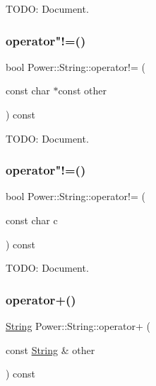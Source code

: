 T\+O\+DO\+: Document. 

\mbox{\label{class_power_1_1_string_a267b8f261bcafb9ec6d86cfe12494c94}} 
\subsubsection{\texorpdfstring{operator"!=()}{operator!=()}\hspace{0.1cm}{\footnotesize\ttfamily [2/3]}}
{\footnotesize\ttfamily bool Power\+::\+String\+::operator!= (\begin{DoxyParamCaption}\item[{const char $\ast$const}]{other }\end{DoxyParamCaption}) const\hspace{0.3cm}{\ttfamily [inline]}}



T\+O\+DO\+: Document. 

\mbox{\label{class_power_1_1_string_a3216ffa5d292b08997d1c93d3c33251e}} 
\subsubsection{\texorpdfstring{operator"!=()}{operator!=()}\hspace{0.1cm}{\footnotesize\ttfamily [3/3]}}
{\footnotesize\ttfamily bool Power\+::\+String\+::operator!= (\begin{DoxyParamCaption}\item[{const char}]{c }\end{DoxyParamCaption}) const\hspace{0.3cm}{\ttfamily [inline]}}



T\+O\+DO\+: Document. 

\mbox{\label{class_power_1_1_string_a570430069e83e0421ccdfb3cddc8a899}} 
\subsubsection{\texorpdfstring{operator+()}{operator+()}\hspace{0.1cm}{\footnotesize\ttfamily [1/11]}}
{\footnotesize\ttfamily \hyperlink{class_power_1_1_string}{String} Power\+::\+String\+::operator+ (\begin{DoxyParamCaption}\item[{const \hyperlink{class_power_1_1_string}{String} \&}]{other }\end{DoxyParamCaption}) const\hspace{0.3cm}{\ttfamily [inline]}}



